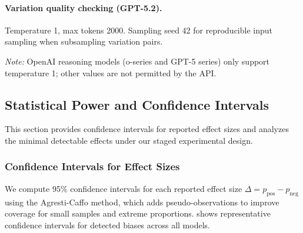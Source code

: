 \paragraph{Variation quality checking (GPT-5.2).} Temperature 1, max tokens 2000. Sampling seed 42 for reproducible input sampling when subsampling variation pairs.

\medskip
\noindent\textit{Note:} OpenAI reasoning models (o-series and GPT-5 series) only support temperature 1; other values are not permitted by the API.

\subsection{Statistical Power and Confidence Intervals}\label{appsubsec:power-analysis}

This section provides confidence intervals for reported effect sizes and analyzes the minimal detectable effects under our staged experimental design.

\subsubsection{Confidence Intervals for Effect Sizes}

We compute 95\% confidence intervals for each reported effect size $\Delta = p_{\text{pos}} - p_{\text{neg}}$ using the Agresti-Caffo method, which adds pseudo-observations to improve coverage for small samples and extreme proportions.  shows representative confidence intervals for detected biases across all models.


